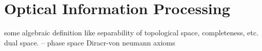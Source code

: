 \chapter{Optical Information Processing}
some algebraic definition like separability of topological space, completeness, etc. dual space. 
-- phase space
Diracr-von neumann axioms
